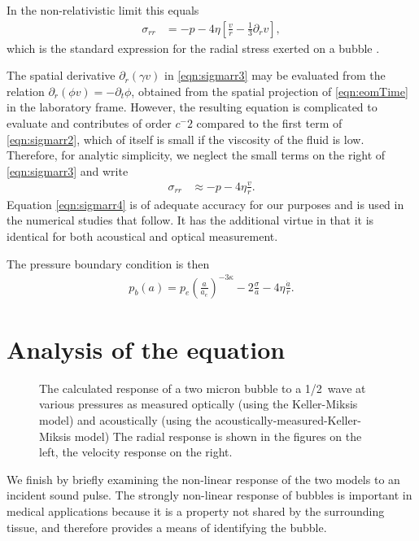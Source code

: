 \documentclass[10pt, fleqn,draft,showtrims,oldfontcommands]{article} %
\newcommand{\eqnref}[1]{\ref{eqn:#1}}
\newcommand{\lr}[1]{\left( #1 \right)}
\newcommand{\lrsquare}[1]{\left[ #1 \right]}
\renewcommand{\d}{\partial}
\newcommand{\dr}{{\d_r}}
\newcommand{\dt}{{\d_t}}
\begin{document}
In the non-relativistic limit this equals 
\begin{align}
 \sigma_{rr}  &= -p - 4\eta \lrsquare{  \frac{v}{r}  -\tfrac{1}{3}\dr v }, \label{eqn:NRsigmarr}
\end{align}
which is  the standard expression for the radial stress exerted on a bubble \cite{Hoff2001}.

The spatial derivative $\dr(\gamma v) $ in \eqnref{sigmarr3} may be evaluated from the relation $\dr (\phi v) = -\dt \phi$, 
obtained from the spatial projection of \eqnref{eomTime}  in the laboratory frame.
However, the resulting equation is complicated to evaluate and contributes of order $c^-2$ compared to the first term of \eqnref{sigmarr2},
which of itself is small if the viscosity of the fluid is low.
Therefore,
for analytic simplicity, we neglect the small terms on the right of 
 \eqnref{sigmarr3} and write
\begin{align}
 \sigma_{rr}  &\approx -p - 4\eta  \frac{v}{r}. \label{eqn:sigmarr4}
\end{align}
Equation \eqnref{sigmarr4} is of  adequate accuracy for our purposes and is used in the numerical studies that follow.
It has the additional virtue in that it is identical for both acoustical and optical measurement.

The pressure boundary condition is then
\begin{align}
  p_b(a) = p_e \lr{\frac{a}{a_e}}^{-3\kappa} - 2\frac{\sigma}{a} - 4\eta  \frac{\dot a}{r}. 
\end{align}

\section{Analysis of the equation}
 \begin{figure}[p!]
      \centering
      \label{fig:BubbleResponse}
      \caption{The calculated response of a two micron bubble to a \unit{1/2}\mega\hertz\ wave at various pressures
as measured optically (using the Keller-Miksis model) and acoustically (using the acoustically-measured-Keller-Miksis model)
      The radial response is shown in the figures on the left, the velocity response on the right.}
 \end{figure}
We finish by briefly examining the non-linear response of the two models to an incident sound pulse.
The strongly non-linear response of bubbles is important 
in medical applications because it is a property not  shared by the surrounding tissue,
and therefore provides a means of identifying the bubble.
\end{document}
